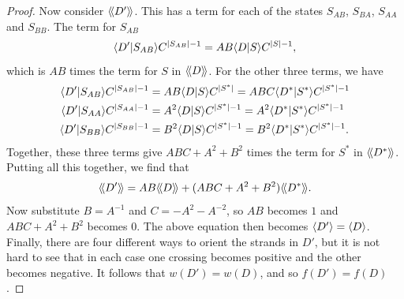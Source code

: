 \documentclass[reqno]{amsart}
\theoremstyle{definition}
\begin{document}
\begin{proof}
 Now consider $\langle\!\langle D'\rangle\!\rangle$.  This has a term for each of the states
 $S_{AB}$, $S_{BA}$, $S_{AA}$ and $S_{BB}$.  The term for $S_{AB}$
 \[ \langle D'|S_{AB}\rangle C^{|S_{AB}|-1} = AB\langle D|S\rangle C^{|S|-1},  \]
 which is $AB$ times the term for $S$ in $\langle\!\langle D\rangle\!\rangle$.  For the other
 three terms, we have 
 \begin{align*}
  \langle D'|S_{AB}\rangle C^{|S_{AB}|-1} &= AB\langle D|S\rangle C^{|S^*|}
                                = ABC \langle D^*|S^*\rangle C^{|S^*|-1} \\
  \langle D'|S_{AA}\rangle C^{|S_{AA}|-1} &= A^2\langle D|S\rangle C^{|S^*|-1}
                                = A^2\langle D^*|S^*\rangle C^{|S^*|-1} \\
  \langle D'|S_{BB}\rangle C^{|S_{BB}|-1} &= B^2\langle D|S\rangle C^{|S^*|-1}
                                = B^2\langle D^*|S^*\rangle C^{|S^*|-1}.
 \end{align*}
 Together, these three terms give $ABC+A^2+B^2$ times the term for
 $S^*$ in $\langle\!\langle D^*\rangle\!\rangle$.  Putting all this together, we find that 
 \[ \langle\!\langle D'\rangle\!\rangle = AB\langle\!\langle D\rangle\!\rangle + (ABC+A^2+B^2)\langle\!\langle D^*\rangle\!\rangle. \]
 Now substitute $B=A^{-1}$ and $C=-A^2-A^{-2}$, so $AB$ becomes $1$
 and $ABC+A^2+B^2$ becomes $0$.  The above equation then becomes
 $\langle D'\rangle=\langle D\rangle$.  Finally, there are four different ways to orient
 the strands in $D'$, but it is not hard to see that in each case one
 crossing becomes positive and the other becomes negative.  It follows
 that $w(D')=w(D)$, and so $f(D')=f(D)$.
\end{proof}
\end{document}
